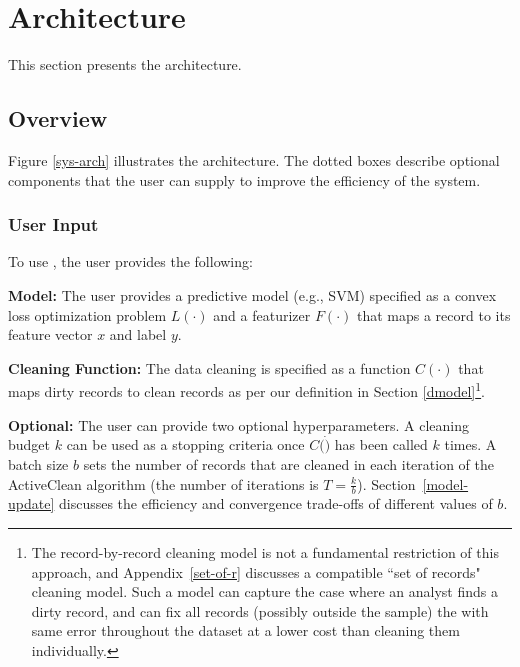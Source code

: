 \section{Architecture}\label{arch}
This section presents the \sys architecture.

\subsection{Overview}\label{sysover}
Figure \ref{sys-arch} illustrates the \sys architecture.
The dotted boxes describe optional components that the user can supply to improve the efficiency of the system.  

\subsubsection{User Input}\label{uinp}
To use \sys, the user provides the following:

\noindent\textbf{Model:} The user provides a predictive model (e.g., SVM) specified as a convex loss optimization problem $L(\cdot)$ and a featurizer $F(\cdot)$ that maps a record to its feature vector $x$ and label $y$.

\vspace{0.25em}

\noindent\textbf{Cleaning Function: } The data cleaning is specified as a function $C(\cdot)$ that maps dirty records to clean records as per our definition in Section \ref{dmodel}\footnote{\small The record-by-record cleaning model is not a fundamental restriction of this approach, and Appendix~\ref{set-of-r} discusses a compatible ``set of records" cleaning model.
Such a model can capture the case where an analyst finds a dirty record, and can fix all records (possibly outside the sample) the with same error throughout the dataset at a lower cost than cleaning them individually.}.

\vspace{0.25em}

\noindent\textbf{Optional: } The user can provide two optional hyperparameters.  
A cleaning budget $k$ can be used as a stopping criteria once $C(\dot)$ has been called $k$ times.
A batch size $b$ sets the number of records that are cleaned in each iteration of the ActiveClean algorithm (the number of iterations is $T = \frac{k}{b}$).
Section~\ref{model-update} discusses the efficiency and convergence trade-offs of different values of $b$.

